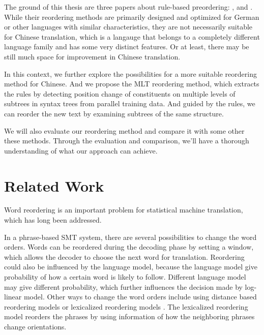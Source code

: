 The ground of this thesis are three papers about rule-based preordering: \cite{short}, \cite{long} and \cite{tree}. While their reordering methods are primarily designed and optimized for German or other languages with similar characteristics, they are not necessarily suitable for Chinese translation, which is a langauge that belongs to a completely different language family and has some very distinct features. Or at least, there may be still much space for improvement in Chinese translation.

In this context, we further explore the possibilities for a more suitable reordering method for Chinese. And we propose the \ac{MLT} reordering method, which extracts the rules by detecting position change of constituents on multiple levels of subtrees in syntax trees from parallel training data. And guided by the rules, we can reorder the new text by examining subtrees of the same structure.

We will also evaluate our reordering method and compare it with some other these methods. Through the evaluation and comparison, we'll have a thorough understanding of what our approach can achieve.





\section{Related Work}
\label{ch:Introduction:sec:RelatedWork}

Word reordering is an important problem for statistical machine translation, which has long been addressed.

In a phrase-based \ac{SMT} system, there are several possibilities to change the word orders. Words can be reordered during the decoding phase by setting a window, which allows the decoder to choose the next word for translation. Reordering could also be influenced by the language model, because the language model give probability of how a certain word is likely to follow. Different language model may give different probability, which further influences the decision made by log-linear model. Other ways to change the word orders include using distance based reordering models or lexicalized reordering models \citep{tillmann2004, koehn2005}. The lexicalized reordering model reorders the phrases by using information of how the neighboring phrases change orientations.

